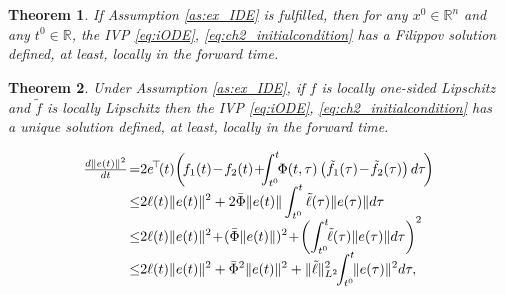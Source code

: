 \documentclass[10pt,a4paper]{amsart}
\newtheorem{theorem}{Theorem}
\newcommand{\R}{\mathbb{R}}
\begin{document}
\begin{theorem}\label{thm:sol_iODE}\itshape
If Assumption \ref{as:ex_IDE} is fulfilled, then
for any $x^0\in \R^n$ and any $t^0\in \R$,  the IVP \eqref{eq:iODE}, \eqref{eq:ch2_initialcondition} has a Filippov solution defined, at least, locally in the forward time. 
\end{theorem}

	\begin{theorem}\itshape\label{thm:uniq_one_side_IDE}
		Under Assumption \ref{as:ex_IDE},
		if $f$ is locally one-sided Lipschitz  and $\tilde f$ is locally Lipschitz  then the IVP \eqref{eq:iODE}, \eqref{eq:ch2_initialcondition} has\\ a  unique solution defined, at least, locally in the forward time. 
	\end{theorem}

	\begin{equation}\label{eq:proof_unique}\small
\begin{split}
		\!\!\!\!\!\tfrac{d \|e(t)\|^2}{dt}\!=&2e^{\!\top}\!(t)\! \left(\! f_1(t)\!-\! f_2(t)\!+\!\!\!\int^t_{t^0}\!\!\Phi(t,\tau) \left(\tilde f_1(\tau)\!-\! \tilde f_2(\tau)\right) d\tau\!\right)\\[-2mm]
	\leq& 2\ell(t)\|e(t)\|^2+2\bar \Phi \|e(t)\|\int^t_{t^0} \tilde \ell(\tau)\|e(\tau)\| d\tau\\[-2mm]
	\leq& 2\ell(t)\|e(t)\|^2\!+\!(\bar \Phi \|e(t)\|)^2\!+\!\left(\int^t_{t^0} \!\!\tilde \ell(\tau)\|e(\tau)\| d\tau\right)^2\\[-2mm]
	\leq &2\ell(t)\|e(t)\|^2+\bar \Phi^2\|e(t)\|^2+\|\tilde \ell\|_{L^2}^2\!\!\int^t_{t^0}\!\! \|e(\tau)\|^2 d\tau, 
	\end{split}\!\!\!\!\vspace{-1mm}
	\end{equation}
\end{document}
